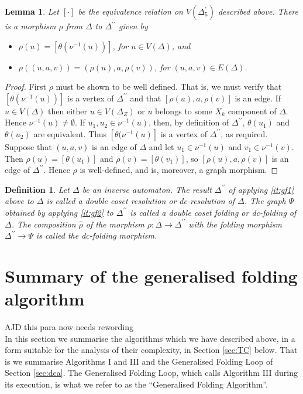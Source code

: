\documentclass[a4paper,12pt]{article}
\newcommand{\D}{\Delta }
\renewcommand{\S}{\Sigma }
\newcommand{\nul}{\emptyset }
\newtheorem{lemma}[theorem]{Lemma}
\newtheorem{definition}[theorem]{Definition}
\numberwithin{equation}{section}
\numberwithin{figure}{section}
\newcommand{\maps}{\rightarrow}
\newenvironment{ajd1}{\noindent\color{red} AJD }{}
\newcommand{\ajd}[1]{\begin{ajd1} #1 \end{ajd1}}
\begin{document}
\begin{lemma}\label{lem:resol-quot}
Let $[\cdot]$ be the equivalence relation on $V(\D^\prime_5)$
described above. There is a morphism $\rho$ from  $\D$ to
$\D^{\prime\prime}$ given by
\begin{itemize}
\item
$\rho(u)=[\theta(\nu^{-1}(u))]$, for
$u\in V(\D)$, and
\item
$\rho((u,a,v))=(\rho(u),a,\rho(v))$, for $(u,a,v)\in  E(\D)$.
\end{itemize}
\end{lemma}
\begin{proof}
First $\rho$ must be shown to be well defined.
That is, we must verify that $[\theta(\nu^{-1}(u))]$ is a vertex of
$\D^{\prime\prime}$ and that $[\rho(u),a,\rho(v)]$ is an edge.
If $u \in V(\D)$
then either $u\in V(\D_Z)$ or  $u$ belongs to
some $X_k$ component of $\D$. Hence
 $\nu^{-1}(u)\neq \nul$. If $u_1, u_2\in \nu^{-1}(u)$, then,
by definition of
$\D^{\prime\prime}$, $\theta(u_1)$ and $\theta(u_2)$ are equivalent.
Thus $[\theta(\nu^{-1}(u)]$ is a vertex of $\D^{\prime\prime}$,
as required.
 Suppose that $(u,a,v)$ is an edge
of $\D$ and let $u_1\in \nu^{-1}(u)$ and $v_1\in \nu^{-1}(v)$. Then
$\rho(u)=[\theta(u_1)]$ and $\rho(v)=[\theta(v_1)]$, so
$[\rho(u), a, \rho(v)]$ is an edge of $\D^{\prime\prime}$.
Hence $\rho$ is well-defined, and is, moreover, a graph morphism.
\end{proof}


\begin{definition}
Let $\D$ be an inverse automaton.
 The result $\D^{\prime\prime}$ of applying  \ref{it:gf1}
above to $\D$ is called a \emph{double coset resolution} or
\emph{dc-resolution} of $\D$. The graph $\Psi$ obtained by applying
 \ref{it:gf2} to $\D^{\prime\prime}$ is called a \emph{double
coset folding} or \emph{dc-folding} of $\D$.  The composition $\hat\rho$ of
the  morphism
$\rho:\D\maps \D^{\prime\prime}$ with the folding morphism $\D^{\prime\prime}\maps
\Psi$ is called the \emph{dc-folding morphism}.
\end{definition}
\section{Summary of the generalised folding algorithm}
\ajd{this para now needs rewording} \\
In this section we summarise the algorithms which we have described above,
in a form suitable for the analysis of their complexity,
in Section \ref{sec:TC} below. That is we summarise Algorithms I and III
and the Generalised Folding Loop of Section \ref{sec:dca}. The Generalised Folding Loop, which calls Algorithm III
during its execution, is what we refer to as the ``Generalised Folding
Algorithm''.
\end{document}
